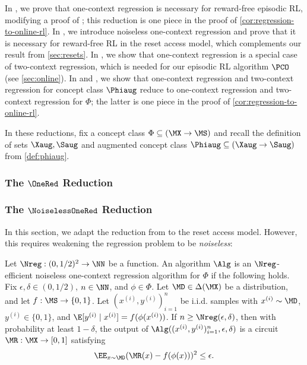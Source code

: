 
In , we prove that one-context regression is necessary for reward-free episodic RL, modifying a proof of \cite{golowich2024exploration}; this reduction is one piece in the proof of \cref{cor:regression-to-online-rl}. In , we introduce noiseless one-context regression and prove that it is necessary for reward-free RL in the reset access model, which complements our result from \cref{sec:resets}. In , we show that one-context regression is a special case of two-context regression, which is needed for our episodic RL algorithm $\PCO$ (see \cref{sec:online}). In  and , we show that one-context regression and two-context regression for concept class $\Phiaug$ reduce to one-context regression and two-context regression for $\Phi$; the latter is one piece in the proof of \cref{cor:regression-to-online-rl}.

In these reductions, fix a concept class $\Phi \subseteq (\MX\to\MS)$ and recall the definition of sets $\Xaug,\Saug$ and augmented concept class $\Phiaug \subseteq (\Xaug\to\Saug)$ from \cref{def:phiaug}.

\subsubsection{The $\OneRed$ Reduction}\label{sec:onered}



\subsubsection{The $\NoiselessOneRed$ Reduction}\label{sec:noiselessonered}

In this section, we adapt the reduction from  to the reset access model. However, this requires weakening the regression problem to be \emph{noiseless}:

\begin{definition}\label{def:noiseless-one-con-regression}
Let $\Nreg: (0,1/2)^2 \to \NN$ be a function. An algorithm $\Alg$ is an $\Nreg$-efficient noiseless one-context regression algorithm for $\Phi$ if the following holds. Fix $\epsilon,\delta \in (0,1/2)$, $n \in \NN$, and $\phi \in \Phi$. Let $\MD \in \Delta(\MX)$ be a distribution, and let $f: \MS \to \{0,1\}$. Let $(x^{(i)},y^{(i)})_{i=1}^n$ be i.i.d. samples with $x^{(i)} \sim \MD$, $y^{(i)} \in \{0,1\}$, and $\E[y^{(i)}\mid{}x^{(i)}] = f(\phi(x^{(i)}))$. If $n \geq \Nreg(\epsilon,\delta)$, then with probability at least $1-\delta$, the output of $\Alg((x^{(i)},y^{(i)})_{i=1}^n, \epsilon,\delta)$ is a circuit $\MR: \MX \to [0,1]$ satisfying 
\[\EE_{x \sim \MD} (\MR(x) - f(\phi(x)))^2 \leq \epsilon.\]
\end{definition}


